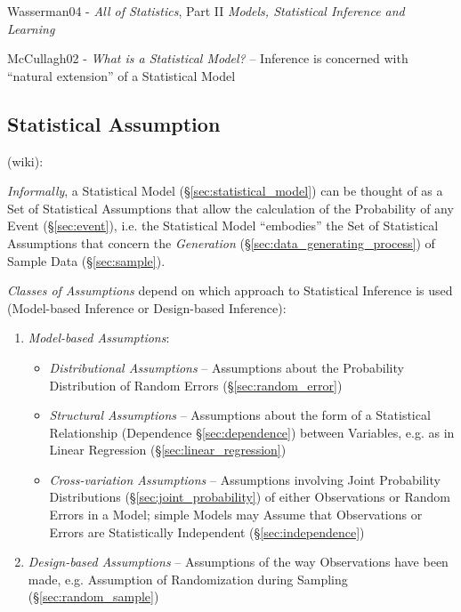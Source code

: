 Wasserman04 - \emph{All of Statistics}, Part II \emph{Models, Statistical
  Inference and Learning}

McCullagh02 - \emph{What is a Statistical Model?} -- Inference is concerned with
``natural extension'' of a Statistical Model



\subsection{Statistical Assumption}\label{sec:statistical_assumption}

(wiki):

\emph{Informally}, a Statistical Model (\S\ref{sec:statistical_model}) can be
thought of as a Set of Statistical Assumptions that allow the calculation of the
Probability of any Event (\S\ref{sec:event}), i.e. the Statistical Model
``embodies'' the Set of Statistical Assumptions that concern the
\emph{Generation} (\S\ref{sec:data_generating_process}) of Sample Data
(\S\ref{sec:sample}).

\emph{Classes of Assumptions} depend on which approach to Statistical Inference
is used (Model-based Inference or Design-based Inference):
\begin{enumerate}
  \item \emph{Model-based Assumptions}:
    \begin{itemize}
      \item \emph{Distributional Assumptions} -- Assumptions about the
        Probability Distribution of Random Errors (\S\ref{sec:random_error})
      \item \emph{Structural Assumptions} -- Assumptions about the form of a
        Statistical Relationship (Dependence \S\ref{sec:dependence}) between
        Variables, e.g. as in Linear Regression (\S\ref{sec:linear_regression})
      \item \emph{Cross-variation Assumptions} -- Assumptions involving Joint
        Probability Distributions (\S\ref{sec:joint_probability}) of either
        Observations or Random Errors in a Model; simple Models may Assume that
        Observations or Errors are Statistically Independent
        (\S\ref{sec:independence})
    \end{itemize}
  \item \emph{Design-based Assumptions} -- Assumptions of the way Observations
    have been made, e.g. Assumption of Randomization during Sampling
    (\S\ref{sec:random_sample})
\end{enumerate}

